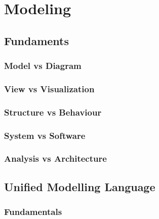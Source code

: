 \chapter{Modeling}
\label{ch:modeling}


\section{Fundaments}


\subsection{Model vs Diagram}


\subsection{View vs Visualization}


\subsection{Structure vs Behaviour}


\subsection{System vs Software}


\subsection{Analysis vs Architecture}


\section{Unified Modelling Language}


\subsection{Fundamentals}

